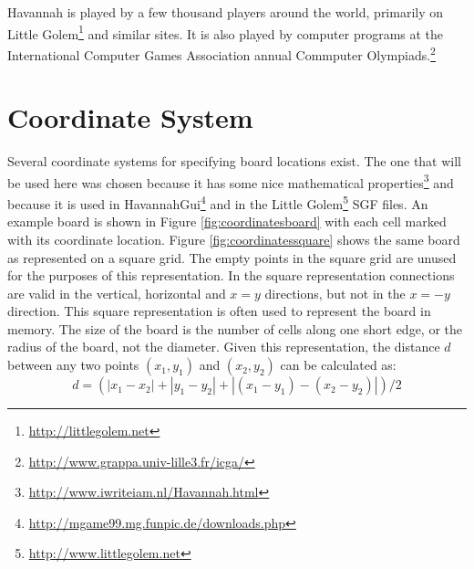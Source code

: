 Havannah is played by a few thousand players around the world, primarily on Little Golem\footnote{\url{http://littlegolem.net}} and similar sites. It is also played by computer programs at the International Computer Games Association annual Commputer Olympiads.\footnote{\url{http://www.grappa.univ-lille3.fr/icga/}}



\section{Coordinate System}

Several coordinate systems for specifying board locations exist. The one that will be used here was chosen because it has some nice mathematical properties\footnote{\url{http://www.iwriteiam.nl/Havannah.html}} and because it is used in HavannahGui\footnote{\url{http://mgame99.mg.funpic.de/downloads.php}} and in the Little Golem\footnote{\url{http://www.littlegolem.net}} SGF files. An example board is shown in Figure \ref{fig:coordinatesboard} with each cell marked with its coordinate location. Figure \ref{fig:coordinatessquare} shows the same board as represented on a square grid. The empty points in the square grid are unused for the purposes of this representation. In the square representation connections are valid in the vertical, horizontal and $x=y$ directions, but not in the $x=-y$ direction. This square representation is often used to represent the board in memory. The size of the board is the number of cells along one short edge, or the radius of the board, not the diameter. Given this representation, the distance $d$ between any two points $(x_1,y_1)$ and $(x_2,y_2)$ can be calculated as: $$d = (|x_1-x_2| + |y_1-y_2| + |(x_1-y_1)-(x_2-y_2)|)/2$$


